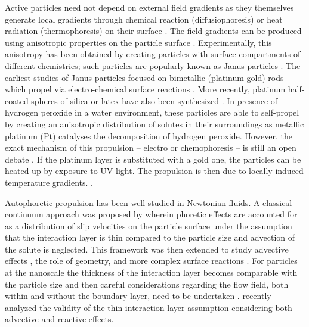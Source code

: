\documentclass[aps,pre,reprint,twocolumn,notitlepage,superscriptaddress]{revtex4-1}
\begin{document}
Active particles need not depend on external field gradients as they themselves generate local gradients through chemical reaction (diffusiophoresis) or heat radiation (thermophoresis) on their surface \citep{anderson1989colloid, paxton2004catalytic, cordova2008osmotic,  ebbens2011direct, julicher2009comment, golestanian2005propulsion, golestanian2007designing}.  The field gradients can be produced using anisotropic properties on the particle surface \citep{golestanian2005propulsion, golestanian2007designing}. Experimentally, this anisotropy has been obtained by creating particles with surface compartments of different chemistries; such particles are popularly known as  Janus particles \citep{Janus_review}. The earliest studies of Janus particles focused on bimetallic (platinum-gold) rods which propel via electro-chemical surface reactions \citep{paxton2004catalytic, mei2011rolled}.  More recently, platinum half-coated spheres of silica or latex have also been synthesized \citep{howse2007self, ke2010motion, campbell2013gravitaxis}. In presence of hydrogen peroxide in a water environment, these particles are able to self-propel by creating an anisotropic distribution of solutes in their surroundings as metallic platinum (Pt) catalyses the decomposition of hydrogen peroxide. However, the exact mechanism of this propulsion -- electro or chemophoresis -- is still an open debate \citep{brown2014ionic, brown2015bulk}. If the platinum layer is substituted with a gold one, the particles can be heated up by exposure to UV light.  The propulsion is then due to locally induced temperature gradients. \citep{jiang2010active}.
 

Autophoretic propulsion has been well studied in Newtonian fluids\citep{Moran_2017}. A classical continuum approach was proposed by \citet{golestanian2007designing} wherein phoretic effects are accounted for as a distribution of slip velocities on the particle surface under the assumption that the interaction layer is thin compared to the particle size and advection of the solute is neglected. This framework was then extended to study advective effects \citep{cordova2008osmotic,julicher2009generic, cordova2013osmotic}, the role of geometry, \citep{popescu2010phoretic} and more complex surface reactions \citep{ebbens2012size}. For particles at the nanoscale the thickness of the interaction layer becomes comparable with the particle size and then careful considerations regarding the flow field, both within and without the boundary layer, need to be undertaken \citep{sabass2012dynamics, sharifi2013diffusiophoretic}. \citet{michelin14} recently analyzed the validity of the thin interaction layer assumption considering both advective and reactive effects. 
\end{document}
